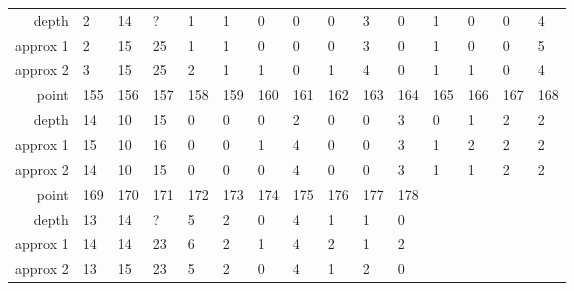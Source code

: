 \begin{center}
\begin{supertabular}{|r|l l l l l l l l l l l l l l|}
\hline
depth & 2 & 14 & ? & 1 & 1 & 0 & 0 & 0 & 3 & 0 & 1 & 0 & 0 & 4 \\
approx 1 & 2 & 15 & 25 & 1 & 1 & 0 & 0 & 0 & 3 & 0 & 1 & 0 & 0 & 5 \\
approx 2 & 3 & 15 & 25 & 2 & 1 & 1 & 0 & 1 & 4 & 0 & 1 & 1 & 0 & 4 \\
\hline
point & 155 & 156 & 157 & 158 & 159 & 160 & 161 & 162 & 163 & 164 & 165 & 166 & 167 & 168 \\
\hline
depth & 14 & 10 & 15 & 0 & 0 & 0 & 2 & 0 & 0 & 3 & 0 & 1 & 2 & 2 \\
approx 1 & 15 & 10 & 16 & 0 & 0 & 1 & 4 & 0 & 0 & 3 & 1 & 2 & 2 & 2 \\
approx 2 & 14 & 10 & 15 & 0 & 0 & 0 & 4 & 0 & 0 & 3 & 1 & 1 & 2 & 2 \\
\hline
point & 169 & 170 & 171 & 172 & 173 & 174 & 175 & 176 & 177 & 178 & & & & \\
\hline
depth & 13 & 14 & ? & 5 & 2 & 0 & 4 & 1 & 1 & 0 & & & & \\
approx 1 & 14 & 14 & 23 & 6 & 2 & 1 & 4 & 2 & 1 & 2 & & & & \\
approx 2 & 13 & 15 & 23 & 5 & 2 & 0 & 4 & 1 & 2 & 0 & & & & \\
  \end{supertabular}
  \label{tab:test.wine4d}
\end{center}

